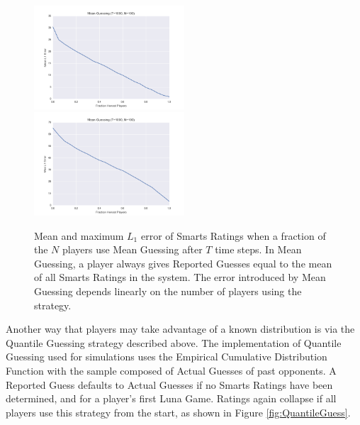 \begin{figure}[h]
\centerline{%
\includegraphics[width=0.5\textwidth]{figures/robustness/Mean_Guessing31.png}%
\includegraphics[width=0.5\textwidth] {figures/robustness/Mean_Guessing32.png}%
}%
\caption{Mean and maximum $L_1$ error of Smarts Ratings when a fraction of the $N$ players use Mean Guessing after $T$ time steps. In Mean Guessing, a player always gives Reported Guesses equal to the mean of all Smarts Ratings in the system. The error introduced by Mean Guessing depends linearly on the number of players using the strategy.}
\label{fig:MeanGuess}
\end{figure}

Another way that players may take advantage of a known distribution is via the Quantile Guessing strategy described above. The implementation of Quantile Guessing used for simulations uses the Empirical Cumulative Distribution Function with the sample composed of Actual Guesses of past opponents. A Reported Guess defaults to Actual Guesses if no Smarts Ratings have been determined, and for a player's first Luna Game. Ratings again collapse if all players use this strategy from the start, as shown in Figure \ref{fig:QuantileGuess}. 


